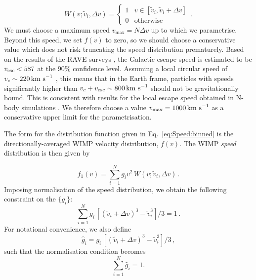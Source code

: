 \begin{equation}
W(v;\tilde{v}_i,\Delta v) =
\begin{cases}
   1 &  v \in [\tilde{v}_i,\tilde{v}_i+\Delta v] \\
   0  & \text{otherwise}
  \end{cases} \,.
\end{equation}
We must choose a maximum speed $v_\textrm{max} = N\Delta v$ up to which we parametrise. Beyond this speed, we set $f(v)$ to zero, so we should choose a conservative value which does not risk truncating the speed distribution prematurely. Based on the results of the RAVE surveys \cite{RAVE:2007, RAVE:2014}, the Galactic escape speed is estimated to be $\vesc < 587$ at the 90\% confidence level. Assuming a local circular speed of $v_c \sim 220 \,\textrm{km s}^{-1}$ \cite{Kerr:1986,Feast:1997}, this means that in the Earth frame, particles with speeds significantly higher than $v_c + \vesc \sim 800 \kms$ should not be gravitationally bound. This is consistent with results for the local escape speed obtained in N-body simulations \cite{Kuhlen:2010}. We therefore choose a value $v_\textrm{max} = 1000 \,\textrm{km s}^{-1}$ as a conservative upper limit for the parametrisation.

The form for the distribution function given in Eq.~\ref{eq:Speed:binned} is the directionally-averaged WIMP velocity distribution, $f(v)$. The WIMP \textit{speed} distribution is then given by

\begin{equation}
\label{eq:Speed:binned2}
f_1(v) = \sum_{i = 1}^N g_i v^2\, W(v;\tilde{v}_i,\Delta v) \,.
\end{equation}
Imposing normalisation of the speed distribution, we obtain the following constraint on the \(\{g_i\}\):
\begin{equation}
\label{eq:Speed:Normg}
\sum_{i = 1}^N g_i \, \left[(\tilde{v}_i + \Delta v)^3 - \tilde{v}_i^3\right]/3 = 1 \,.
\end{equation}
For notational convenience, we also define
\begin{equation}
\hat{g}_i = g_i \, \left[(\tilde{v}_i + \Delta v)^3 - \tilde{v}_i^3\right]/3 \,,
\end{equation}
such that the normalisation condition becomes
\begin{equation}
\label{eq:Speed:ghat}
\sum_{i = 1}^N \hat{g}_i = 1.
\end{equation}


